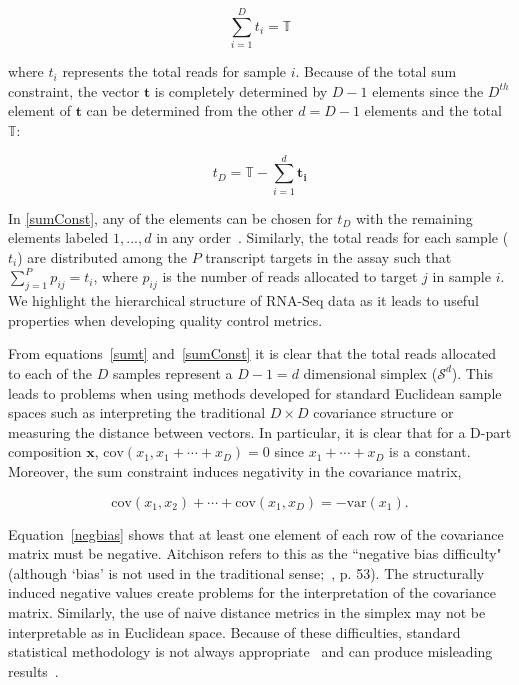 \begin{equation}
\sum_{i=1}^{D} t_i = \mathbb{T}
\label{sumt}
\end{equation}

where $t_i$ represents the total reads for sample $i$.  Because of the total sum constraint, the vector $\mathbf{t}$ is completely determined by $D-1$ elements since the $D^{th}$ element of $\mathbf{t}$ can be determined from the other $d = D-1$ elements and the total $\mathbb{T}$:  

\begin{equation}
t_D = \mathbb{T} - \sum_{i=1}^{d} \mathbf{t_i}
\label{sumConst}
\end{equation}

In \ref{sumConst}, any of the elements can be chosen for $t_D$ with the remaining elements labeled $1, ..., d$ in any order~\cite{Aitchison1986}.  Similarly, the total reads for each sample ($t_i$) are distributed among the $P$ transcript targets in the assay such that $\sum_{j=1}^{P} p_{ij} = t_i$, where $p_{ij}$ is the number of reads allocated to target $j$ in sample $i$.  We highlight the hierarchical structure of RNA-Seq data as it leads to useful properties when developing quality control metrics.


From equations~\ref{sumt} and~\ref{sumConst} it is clear that the total reads allocated to each of the $D$ samples represent a $D - 1 = d$ dimensional simplex ($\mathcal{S}^d$). This leads to problems when using methods developed for standard Euclidean sample spaces such as interpreting the traditional $D \times D$ covariance structure or measuring the distance between vectors.  In particular, it is clear that for a D-part composition $\mathbf{x}$, $\text{cov}(x_1, x_1+ \cdots +x_D) = 0$  since $x_1 + \cdots + x_D$ is a constant.  Moreover, the sum constraint induces negativity in the covariance matrix,

\begin{equation}
\text{cov}(x_1, x_2) + \cdots + \text{cov}(x_1, x_D) = -\text{var}(x_1).
\label{negbias}
\end{equation}

Equation~\ref{negbias} shows that at least one element of each row of the covariance matrix must be negative. Aitchison refers to this as the ``negative bias difficulty" (although `bias' is not used in the traditional sense;~\cite{Aitchison1986}, p. 53). The structurally induced negative values create problems for the interpretation of the covariance matrix.  Similarly, the use of naive distance metrics in the simplex may not be interpretable as in Euclidean space. Because of these difficulties, standard statistical methodology is not always appropriate~\cite{Aitchison1986} and can produce misleading results~\cite{Lovell2015}.



